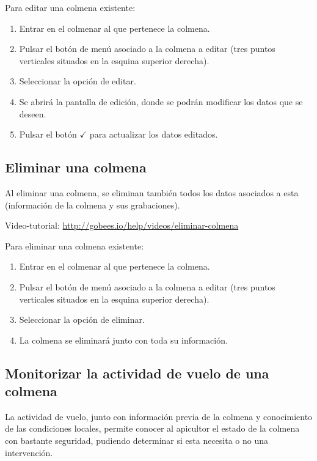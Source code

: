 Para editar una colmena existente:

\begin{enumerate}
\def\labelenumi{\arabic{enumi}.}
\tightlist
\item
  Entrar en el colmenar al que pertenece la colmena.
\item
  Pulsar el botón de menú asociado a la colmena a editar (tres puntos
  verticales situados en la esquina superior derecha).
\item
  Seleccionar la opción de editar.
\item
  Se abrirá la pantalla de edición, donde se podrán modificar los datos
  que se deseen.
\item
  Pulsar el botón {$\checkmark$} para actualizar los datos editados.
\end{enumerate}

\subsection{Eliminar una colmena}\label{eliminar-una-colmena}

Al eliminar una colmena, se eliminan también todos los datos asociados a
esta (información de la colmena y sus grabaciones).

Video-tutorial: \url{http://gobees.io/help/videos/eliminar-colmena}

Para eliminar una colmena existente:

\begin{enumerate}
\def\labelenumi{\arabic{enumi}.}
\tightlist
\item
  Entrar en el colmenar al que pertenece la colmena.
\item
  Pulsar el botón de menú asociado a la colmena a editar (tres puntos
  verticales situados en la esquina superior derecha).
\item
  Seleccionar la opción de eliminar.
\item
  La colmena se eliminará junto con toda su información.
\end{enumerate}

\subsection{Monitorizar la actividad de vuelo de una
colmena}\label{monitorizar-la-actividad-de-vuelo-de-una-colmena}

La actividad de vuelo, junto con información previa de la colmena y
conocimiento de las condiciones locales, permite conocer al apicultor el
estado de la colmena con bastante seguridad, pudiendo determinar si esta
necesita o no una intervención.

